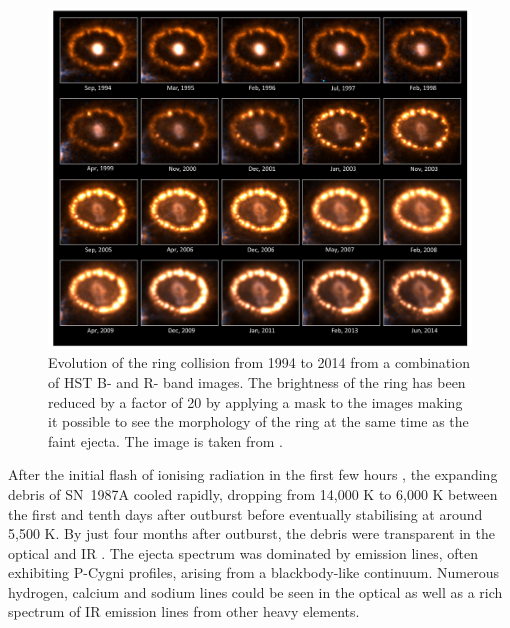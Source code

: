 \begin{figure}
\centering
\includegraphics[clip=true,scale=0.4,trim= 0 0 0 0]{chapters/chapter5/images/HST_ring.png}
\caption{Evolution of the ring collision from 1994 to 2014 from a combination of HST B- and R- band images.  The brightness of the ring has been reduced by a factor of 20 by applying a mask to the images making it possible to see the morphology of the ring at the same time as the faint ejecta.  The image is taken from \citep{Fransson2015}.}
\label{HST_ring}
\end{figure}

After the initial flash of ionising radiation in the first few hours \citep{Ensman1992}, the expanding debris of SN~1987A cooled rapidly, dropping from 14,000 K to 6,000 K between the first and tenth days after outburst \citep{Kirshner1987} before eventually stabilising at around 5,500 K.  By just four months after outburst, the debris were transparent in the optical and IR \citep{McCray1993}.  The ejecta spectrum was dominated by emission lines, often exhibiting P-Cygni profiles, arising from a blackbody-like continuum.  Numerous hydrogen, calcium and sodium lines could be seen in the optical as well as a rich spectrum of IR emission lines  from other heavy elements.  


